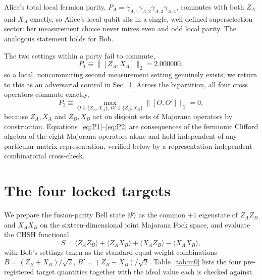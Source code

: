 \documentclass[aps,pra,twocolumn,superscriptaddress,floatfix,nofootinbib]{revtex4-2}
\providecommand{\ket}[1]{\lvert #1 \rangle}
\begin{document}
Alice's total local fermion parity,
$P_A=\gamma_{A,1}\gamma_{A,2}\gamma_{A,3}\gamma_{A,4}$, commutes with
both $Z_A$ and $X_A$ exactly, so Alice's local qubit sits in a single,
well-defined superselection sector: her measurement choice never mixes
even and odd local parity. The analogous statement holds for Bob.

The two settings within a party fail to commute,
\begin{equation}
\label{eq:P1}
P_1 \equiv \lVert[Z_A,X_A]\rVert_2 = 2.000000,
\end{equation}
so a local, noncommuting second measurement setting genuinely exists;
we return to this as an adversarial control in Sec.~\ref{sec:m0}.
Across the bipartition, all four cross operators commute exactly,
\begin{equation}
\label{eq:P2}
P_2 \equiv \max_{O\in\{Z_A,X_A\},\,O'\in\{Z_B,X_B\}} \lVert[O,O']\rVert_2 = 0,
\end{equation}
because $Z_A,X_A$ and $Z_B,X_B$ act on disjoint sets of Majorana
operators by construction. Equations~\eqref{eq:P1}--\eqref{eq:P2} are
consequences of the fermionic Clifford algebra of the eight Majorana
operators alone and hold independent of any particular matrix
representation, verified below by a representation-independent
combinatorial cross-check.

\section{The four locked targets}
\label{sec:m0}

We prepare the fusion-parity Bell state $\ket{\Psi}$ as the common
$+1$ eigenstate of $Z_AZ_B$ and $X_AX_B$ on the sixteen-dimensional
joint Majorana Fock space, and evaluate the CHSH functional
\begin{equation}
S = \langle Z_AZ_B\rangle + \langle Z_AX_B\rangle
  + \langle X_AZ_B\rangle - \langle X_AX_B\rangle,
\end{equation}
with Bob's settings taken as the standard equal-weight combinations
$B=(Z_B+X_B)/\sqrt2$, $B'=(Z_B-X_B)/\sqrt2$. Table~\ref{tab:m0} lists
the four pre-registered target quantities together with the ideal
value each is checked against.
\end{document}

